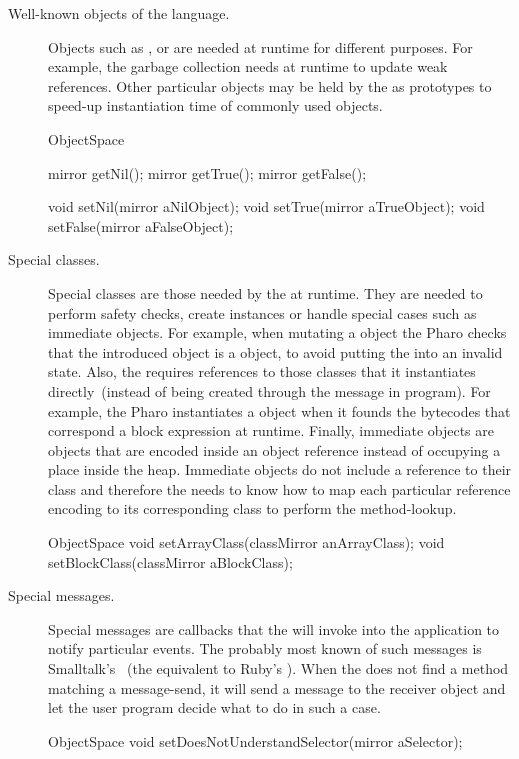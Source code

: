\begin{description}
\item[Well-known objects of the language.] Objects such as ,  or  are needed at runtime for different purposes. For example, the garbage collection needs  at runtime to update weak references. Other particular objects may be held by the \VM as prototypes to speed-up instantiation time of commonly used objects.

\begin{code}
ObjectSpace {
    mirror getNil();
    mirror getTrue();
    mirror getFalse();

    void setNil(mirror aNilObject);
    void setTrue(mirror aTrueObject);
    void setFalse(mirror aFalseObject);
}
\end{code}

\item[Special classes.] Special classes are those needed by the \VM at runtime. They are needed to perform safety checks, create instances or handle special cases such as immediate objects. For example, when mutating a  object the Pharo \VM checks that the introduced object is a  object, to avoid putting the  into an invalid state. Also, the \VM requires references to those classes that it instantiates directly~(instead of being created through the  message in program). For example, the Pharo \VM instantiates a  object when it founds the bytecodes that correspond a block expression at runtime. Finally, immediate objects are objects that are encoded inside an object reference instead of occupying a place inside the heap. Immediate objects do not include a reference to their class and therefore the \VM needs to know how to map each particular reference encoding to its corresponding class to perform the method-lookup. 

\begin{code}
ObjectSpace {
    void setArrayClass(classMirror anArrayClass);
    void setBlockClass(classMirror aBlockClass);
}
\end{code}

\item[Special messages.] Special messages are callbacks that the \VM will invoke into the application to notify particular events. The probably most known of such messages is Smalltalk's ~(the equivalent to \eg Ruby's ). When the \VM does not find a method matching a message-send, it will send a  message to the receiver object and let the user program decide what to do in such a case.

\begin{code}
ObjectSpace {
    void setDoesNotUnderstandSelector(mirror aSelector);
}
\end{code}

\end{description}

